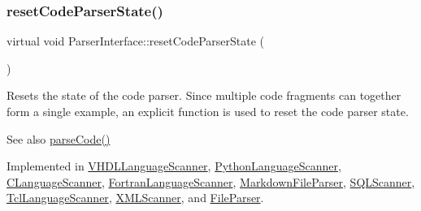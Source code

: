\mbox{\label{class_parser_interface_aee4fccd1865a4e8a6b9f2896811104ca}} 
\subsubsection{\texorpdfstring{resetCodeParserState()}{resetCodeParserState()}}
{\footnotesize\ttfamily virtual void Parser\+Interface\+::reset\+Code\+Parser\+State (\begin{DoxyParamCaption}{ }\end{DoxyParamCaption})\hspace{0.3cm}{\ttfamily [pure virtual]}}

Resets the state of the code parser. Since multiple code fragments can together form a single example, an explicit function is used to reset the code parser state. \begin{DoxySeeAlso}{See also}
\mbox{\hyperlink{class_parser_interface_a2ffc28f9dd7c47e2581376a573426395}{parse\+Code()}} 
\end{DoxySeeAlso}


Implemented in \mbox{\hyperlink{class_v_h_d_l_language_scanner_a67461c7de314e7f414fb70d5735727c3}{V\+H\+D\+L\+Language\+Scanner}}, \mbox{\hyperlink{class_python_language_scanner_a7d8f587a1753e7d04dee2b5ddbc6c1df}{Python\+Language\+Scanner}}, \mbox{\hyperlink{class_c_language_scanner_a2d569ccde3f87597741b3cde8efb3af5}{C\+Language\+Scanner}}, \mbox{\hyperlink{class_fortran_language_scanner_a431c7d79af2cd6b93081f3db7cdaf1c0}{Fortran\+Language\+Scanner}}, \mbox{\hyperlink{class_markdown_file_parser_a78b5337fc2b6a6dd1ee5ce104005e566}{Markdown\+File\+Parser}}, \mbox{\hyperlink{class_s_q_l_scanner_ad419869977f9e82f027bf07df2c31287}{S\+Q\+L\+Scanner}}, \mbox{\hyperlink{class_tcl_language_scanner_abb80856bb640644a4eaeeac91a427b45}{Tcl\+Language\+Scanner}}, \mbox{\hyperlink{class_x_m_l_scanner_a77da43900e68df9a111eb45546d94fd4}{X\+M\+L\+Scanner}}, and \mbox{\hyperlink{class_file_parser_af8af94eb387a7ed046f52bc36d2f615a}{File\+Parser}}.

\mbox{\label{class_parser_interface_a72478f87ead5fde10d7d6bbe32a73024}} 
